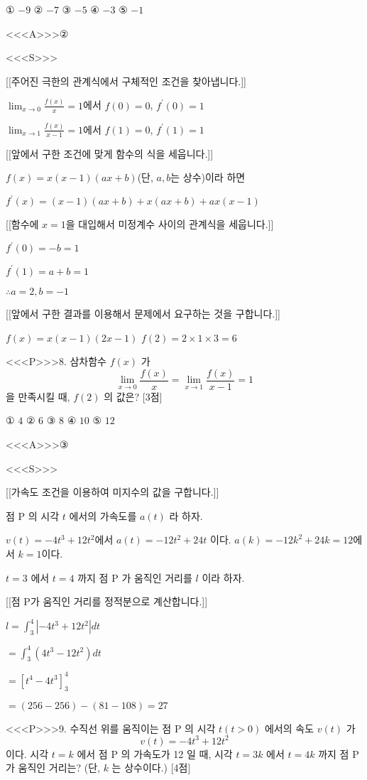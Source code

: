 \documentclass{oblivoir}
\begin{document}
① $-9$
② $-7$
③ $-5$
④ $-3$
⑤ $-1$

<<<A>>>②

<<<S>>>

[[주어진 극한의 관계식에서 구체적인 조건을 찾아냅니다.]]

$\lim _{x \rightarrow 0} \frac{f(x)}{x}=1$에서 $f(0)=0$, $f^{\prime}(0)=1$

$\lim _{x \rightarrow 1} \frac{f(x)}{x-1}=1$에서 $f(1)=0$, $f^{\prime}(1)=1$

[[앞에서 구한 조건에 맞게 함수의 식을 세웁니다.]]

$f(x)=x(x-1)(a x+b)$(단, $a, b$는 상수)이라 하면

$f^{\prime}(x)=(x-1)(a x+b)+x(a x+b)+a x(x-1)$

[[함수에 $x=1$을 대입해서 미정계수 사이의 관계식을 세웁니다.]]

$f^{\prime}(0)=-b=1$

$f^{\prime}(1)=a+b=1$

$\therefore a=2, b=-1$

[[앞에서 구한 결과를 이용해서 문제에서 요구하는 것을 구합니다.]]

$f(x)=x(x-1)(2 x-1)$
$f(2)=2 \times 1 \times 3=6$


<<<P>>>8. 삼차함수 $f(x)$ 가
$$
\lim _{x \rightarrow 0} \frac{f(x)}{x}=\lim _{x \rightarrow 1} \frac{f(x)}{x-1}=1
$$
을 만족시킬 때, $f(2)$ 의 값은? [3점]

① $4$
② $6$
③ $8$
④ $10$
⑤ $12$

<<<A>>>③

<<<S>>>

[[가속도 조건을 이용하여 미지수의 값을 구합니다.]]

점 $\mathrm{P}$ 의 시각 $t$ 에서의 가속도를 $a(t)$ 라 하자.

$v(t)=-4 t^{3}+12 t^{2}$에서 $a(t)=-12 t^{2}+24 t $ 이다.
$a(k)=-12 k^{2}+24 k=12$에서 $k=1$이다.

$t=3$ 에서 $t=4$ 까지 점 $\mathrm{P}$ 가 움직인 거리를 $l$ 이라 하자.

[[점 $\mathrm{P}$가 움직인 거리를 정적분으로 계산합니다.]]

$l =\int_{3}^{4}\left|-4 t^{3}+12 t^{2}\right| d t$

$=\int_{3}^{4}\left(4 t^{3}-12 t^{2}\right) d t$

$=\left[t^{4}-4 t^{3}\right]_{3}^{4}$

$=(256-256)-(81-108)=27$


<<<P>>>9. 수직선 위를 움직이는 점 $\mathrm{P}$ 의 시각 $t(t>0)$ 에서의 속도 $v(t)$ 가
$$
v(t)=-4 t^{3}+12 t^{2}
$$
이다. 시각 $t=k$ 에서 점 $\mathrm{P}$ 의 가속도가 12 일 때, 시각 $t=3 k$ 에서 $t=4 k$ 까지 점 $\mathrm{P}$ 가 움직인 거리는? (단, $k$ 는 상수이다.) [4점]
\end{document}
